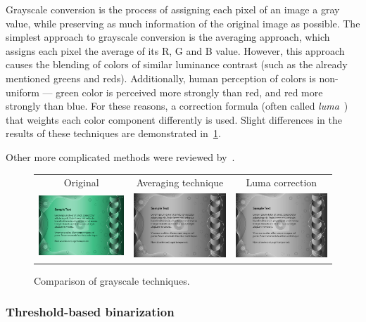 Grayscale conversion is the process of assigning each pixel of an image a gray value, while preserving as much information of the original image as possible. The simplest approach to grayscale conversion is the averaging approach, which assigns each pixel the average of its R, G and B value. However, this approach causes the blending of colors of similar luminance contrast (such as the already mentioned greens and reds). Additionally, human perception of colors is non-uniform --- green color is perceived more strongly than red, and red more strongly than blue. For these reasons, a correction formula (often called \emph{luma}~\cite{grayscaleConv}) that weights each color component differently is used. Slight differences in the results of these techniques are demonstrated in~\cref{fig:preprocessGrayscale}.

Other more complicated methods were reviewed by~\citet{grayscaleCadik}.

\begin{figure}[t]
\centering
{\sffamily
\begin{tabular}{ccc}
Original & Averaging technique & Luma correction \\
\includegraphics[width=.28\linewidth]{img/preprocessing/grayscale_orig.jpg}
&
\includegraphics[width=.28\linewidth]{img/preprocessing/grayscale_avg.png}
&
\includegraphics[width=.28\linewidth]{img/preprocessing/grayscale_luma.png}
\end{tabular}
}
\caption{Comparison of grayscale techniques.}
\label{fig:preprocessGrayscale}
\end{figure}

\subsubsection{Threshold-based binarization}

